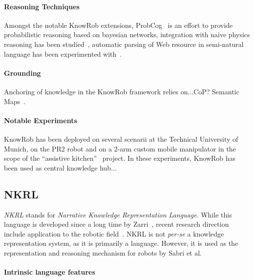 \paragraph{Reasoning Techniques} Amongst the notable {\sc KnowRob} extensions,
{\sc ProbCog}~\cite{Jain2009} is an effort to provide probabilistic reasoning
based on bayesian networks, integration with naive physics reasoning has been
studied~\cite{Kunze2011a}, automatic parsing of Web resource in semi-natural
language has been experimented with~\cite{Nyga2009}.

\paragraph{Grounding} Anchoring of knowledge in the {\sc KnowRob} framework
relies on...CoP? Semantic Maps~\cite{Blodow2011}.


\paragraph{Notable Experiments} {\sc KnowRob} has been deployed on several
scenarii at the Technical University of Munich, on the PR2 robot and on a 2-arm
custom mobile manipulator in the scope of the ``assistive
kitchen''~\cite{Beetz2008} project. In these experiments, {\sc KnowRob} has
been used as central knowledge hub...

\subsection{NKRL}
\label{sect|nkrl}

\emph{NKRL} stands for \emph{Narrative Knowledge Representation Language}.
While this language is developed since a long time by Zarri~\cite{Zarri1997,
Zarri2008}, recent research direction include application to the robotic
field~\cite{Sabri2011}. NKRL is not {\it per-se} a knowledge representation
system, as it is primarily a language. However, it is used as the
representation and reasoning mechanism for robots by Sabri et al.

\paragraph{Intrinsic language features}
\label{sect|nkrl-intrinsic-features}

